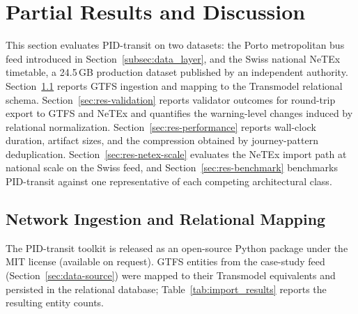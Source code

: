 
\graphicspath{%
  {./Chapter-4/}%
}

\chapter{Partial Results and Discussion}
\label{sec:results}
 
This section evaluates PID-transit on two datasets: the Porto metropolitan bus
feed introduced in Section~\ref{subsec:data_layer}, and the Swiss national NeTEx
timetable, a 24.5\,GB production dataset published by an independent authority.
Section~\ref{sec:res-ingestion} reports GTFS ingestion
and mapping to the Transmodel relational schema. Section~\ref{sec:res-validation}
reports validator outcomes for round-trip export to GTFS and NeTEx and quantifies
the warning-level changes induced by relational normalization.
Section~\ref{sec:res-performance} reports wall-clock duration, artifact sizes, and
the compression obtained by journey-pattern deduplication.
Section~\ref{sec:res-netex-scale} evaluates the NeTEx import path at national
scale on the Swiss feed, and Section~\ref{sec:res-benchmark} benchmarks
PID-transit against one representative of each competing architectural class.
 
\section{Network Ingestion and Relational Mapping}
\label{sec:res-ingestion}
 
The PID-transit toolkit is released as an open-source Python package under the MIT
license (available on request). GTFS entities
from the case-study feed (Section~\ref{sec:data-source}) were mapped to their
Transmodel equivalents and persisted in the relational database;
Table~\ref{tab:import_results} reports the resulting entity counts.
 
